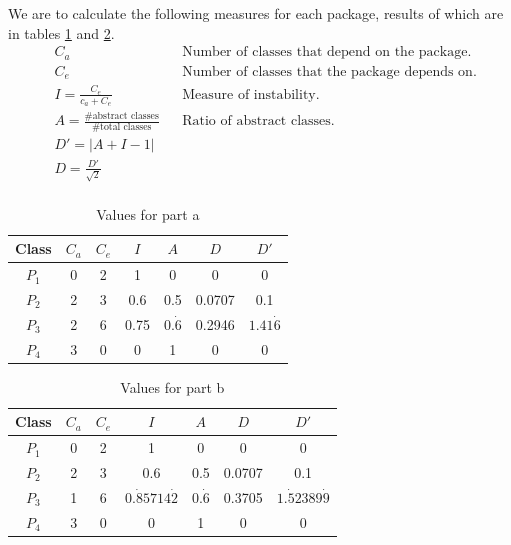 \documentclass{article}
\begin{document}
\begin{enumerate}[label=\alph*.]
		We are to calculate the following measures for each package, results of which are in tables \ref{q1a-tbl1} and \ref{q1a-tbl2}.
		\begin{align*}
			 & C_a                                                            &  & \text{Number of classes that depend on the package.} \\
			 & C_e                                                            &  & \text{Number of classes that the package depends on.} \\
			 & I = \frac{C_e}{c_a + C_e}                                      &  & \text{Measure of instability.} \\
			 & A = \frac{\# \text{abstract classes}}{\# \text{total classes}} &  & \text{Ratio of abstract classes.} \\
			 & D' = |A+I-1| \\
			 & D = \frac{D'}{\sqrt{2}} \\
		\end{align*}

		\begin{table}[htbp]
			\centering
			\begin{tabular}{||c||c|c|c|c|c|c||}
				\hline
				Class   & \(C_a\) & \(C_e\) & \(I\) & \(A\)         & \(D\)  & \(D'\) \\
				\hline
				\(P_1\) & 0       & 2       & 1     & 0             & 0      & 0 \\
				\(P_2\) & 2       & 3       & 0.6   & 0.5           & 0.0707 & 0.1 \\
				\(P_3\) & 2       & 6       & 0.75  & \(0.\dot{6}\) & 0.2946 & \(1.41\dot{6}\) \\
				\(P_4\) & 3       & 0       & 0     & 1             & 0      & 0 \\
				\hline
			\end{tabular}
			\caption{Values for part a}
			\label{q1a-tbl1}
		\end{table}

		\begin{table}[htbp]
			\centering
			\begin{tabular}{||c||c|c|c|c|c|c||}
				\hline
				Class   & \(C_a\) & \(C_e\) & \(I\)                    & \(A\)         & \(D\)  & \(D'\) \\
				\hline
				\(P_1\) & 0       & 2       & 1                        & 0             & 0      & 0 \\
				\(P_2\) & 2       & 3       & 0.6                      & 0.5           & 0.0707 & 0.1 \\
				\(P_3\) & 1       & 6       & \(0.\dot{8}5714\dot{2}\) & \(0.\dot{6}\) & 0.3705 & \(1.\dot{5}2389\dot{9}\) \\
				\(P_4\) & 3       & 0       & 0                        & 1             & 0      & 0 \\
				\hline
			\end{tabular}
			\caption{Values for part b}
			\label{q1a-tbl2}
		\end{table}


\end{enumerate}
\end{document}
